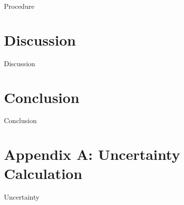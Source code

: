\documentclass[journal,letterpaper]{IEEEtran}
\begin{document}
Procedure


\section{Discussion}


Discussion


\section{Conclusion}


Conclusion


\section*{Appendix A: Uncertainty Calculation}


Uncertainty



\end{document}
